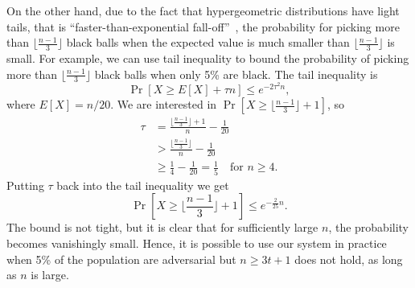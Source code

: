 On the other hand, due to the fact that hypergeometric distributions have light tails,
that is ``faster-than-exponential fall-off''~\cite{skala2013hypergeometric},
the probability for picking more than $\lfloor \frac{n-1}{3} \rfloor$ black balls when 
the expected value is  much smaller than $\lfloor \frac{n-1}{3} \rfloor$ is small.
For example, we can use tail inequality to bound the probability of picking more than $\lfloor \frac{n-1}{3} \rfloor$ black balls when only 5\% are black.
The tail inequality is
$$
\Pr[X \ge E[X] + \tau n] \le e^{-2\tau^2n},
$$
where $E[X] = n/20$.
We are interested in $\Pr[X \ge \lfloor \frac{n-1}{3} \rfloor + 1]$, so
\begin{align*}
\tau &= \frac{\lfloor \frac{n-1}{3} \rfloor + 1}{n} - \frac{1}{20} \\
  &> \frac{\lfloor \frac{n-1}{3} \rfloor}{n} - \frac{1}{20} \\
  &\ge \frac{1}{4} - \frac{1}{20} = \frac{1}{5} \quad \text{for $n \ge 4$}.
\end{align*}
Putting $\tau$ back into the tail inequality we get
$$
\Pr[X \ge \lfloor \frac{n-1}{3} \rfloor + 1] \le e^{-\frac{2}{25} n}.
$$
The bound is not tight, but it is clear that for sufficiently large $n$, the probability becomes vanishingly small.
Hence, it is possible to use our system in practice when 5\% of the population are adversarial but $n \ge 3t + 1$ does not hold,
as long as $n$ is large.

